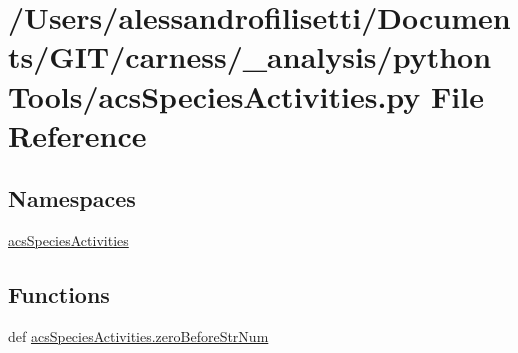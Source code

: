 \hypertarget{a00046}{\section{/\-Users/alessandrofilisetti/\-Documents/\-G\-I\-T/carness/\-\_\-analysis/python\-Tools/acs\-Species\-Activities.py File Reference}
\label{a00046}
}
\subsection*{Namespaces}
\begin{DoxyCompactItemize}
\item 
\hyperlink{a00129}{acs\-Species\-Activities}
\end{DoxyCompactItemize}
\subsection*{Functions}
\begin{DoxyCompactItemize}
\item 
def \hyperlink{a00129_ac217c91fe2eee20671291adb12bbbbb2}{acs\-Species\-Activities.\-zero\-Before\-Str\-Num}
\end{DoxyCompactItemize}
